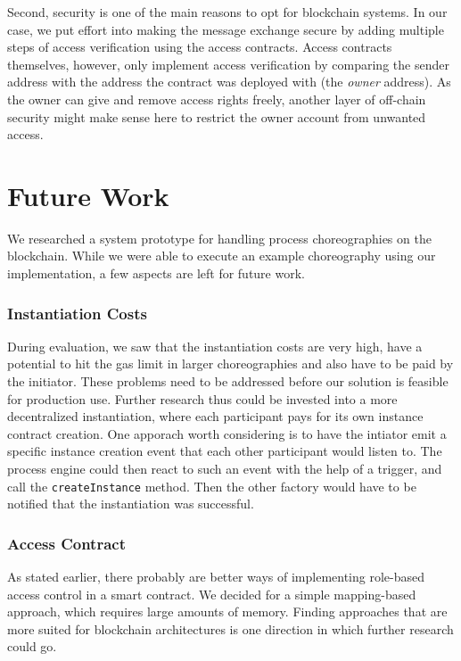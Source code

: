 \documentclass[runningheads]{llncs}
\begin{document}
Second, security is one of the main reasons to opt for blockchain systems.
In our case, we put effort into making the message exchange secure by adding multiple steps of access verification using the access contracts.
Access contracts themselves, however, only implement access verification by comparing the sender address with the address the contract was deployed with (the \emph{owner} address).
As the owner can give and remove access rights freely, another layer of off-chain security might make sense here to restrict the owner account from unwanted access.

\section{Future Work} \label{futurework}

We researched a system prototype for handling process choreographies on the blockchain.
While we were able to execute an example choreography using our implementation, a few aspects are left for future work.

\subsubsection{Instantiation Costs}

During evaluation, we saw that the instantiation costs are very high, have a potential to hit the gas limit in larger choreographies and also have to be paid by the initiator.
These problems need to be addressed before our solution is feasible for production use.
Further research thus could be invested into a more decentralized instantiation, where each participant pays for its own instance contract creation.
One apporach worth considering is to have the intiator emit a specific instance creation event that each other participant would listen to.
The process engine could then react to such an event with the help of a trigger, and call the \texttt{createInstance} method.
Then the other factory would have to be notified that the instantiation was successful.

\subsubsection{Access Contract}

As stated earlier, there probably are better ways of implementing role-based access control in a smart contract.
We decided for a simple mapping-based approach, which requires large amounts of memory.
Finding approaches that are more suited for blockchain architectures is one direction in which further research could go.
\end{document}
